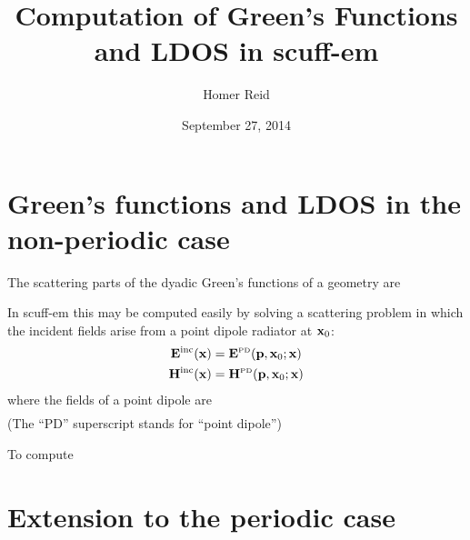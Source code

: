 \documentclass[letterpaper]{article}
\title {Computation of Green's Functions and LDOS in {\sc scuff-em}}
\author {Homer Reid}
\date {September 27, 2014}
\begin{document}
\pagestyle{myheadings}
\maketitle

\tableofcontents

\section{Green's functions and LDOS in the non-periodic case}

The scattering parts of the dyadic Green's functions of a geometry
are

In {\sc scuff-em} this may be computed easily by solving a scattering
problem in which the incident fields arise from a point dipole
radiator at $\mathbf{x}_0$:
\begin{align*}
 \mathbf{E}^{\hbox{\scriptsize{inc}}}(\mathbf{x}) &= \mathbf{E}^{\hbox{\tiny{PD}}}(\mathbf{p}, \mathbf{x}_0; \mathbf{x})
\\
 \mathbf{H}^{\hbox{\scriptsize{inc}}}(\mathbf{x}) &= \mathbf{H}^{\hbox{\tiny{PD}}}(\mathbf{p}, \mathbf{x}_0; \mathbf{x})
\end{align*}
where the fields of a point dipole are 
\begin{subequations}
\begin{align*}
\end{align*}
\label{PDFields}
\end{subequations}
(The ``PD'' superscript stands for ``point dipole'')

To compute

\section{Extension to the periodic case}
\end{document}
